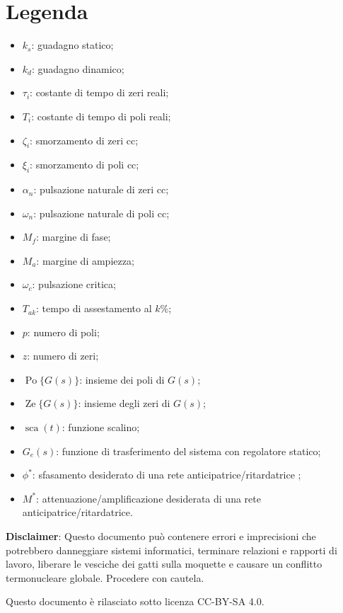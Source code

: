 \documentclass[answers, a4paper, 11pt]{exam}
\DeclareMathOperator{\sca}{sca}
\DeclareMathOperator{\Po}{Po}
\DeclareMathOperator{\Ze}{Ze}
\begin{document}
\section{Legenda}
\begin{itemize}
\item $k_s$: guadagno statico;
\item $k_d$: guadagno dinamico;
\item $\tau_i$: costante di tempo di zeri reali;
\item $T_i$: costante di tempo di poli reali;
\item $\zeta_i$: smorzamento di zeri cc;
\item $\xi_i$: smorzamento di poli cc;
\item $\alpha_n$: pulsazione naturale di zeri cc;
\item $\omega_n$: pulsazione naturale di poli cc;
\item $M_f$: margine di fase;
\item $M_a$: margine di ampiezza;
\item $\omega_c$: pulsazione critica;
\item $T_{ak}$: tempo di assestamento al $k\%$;
\item $p$: numero di poli;
\item $z$: numero di zeri;
\item $\Po\{G(s)\}$: insieme dei poli di $G(s)$;
\item $\Ze\{G(s)\}$: insieme degli zeri di $G(s)$;
\item $\sca(t)$: funzione scalino;
\item $G_e(s)$: funzione di trasferimento del sistema con regolatore statico;
\item $\phi^*$: sfasamento desiderato di una rete anticipatrice/ritardatrice ;
\item $M^*$: attenuazione/amplificazione desiderata di una rete anticipatrice/ritardatrice.
\end{itemize}
\fi
\textbf{Disclaimer}:  Questo documento può contenere errori e imprecisioni che potrebbero danneggiare sistemi informatici, terminare relazioni e rapporti di lavoro, liberare le vesciche dei gatti sulla moquette e causare un conflitto termonucleare globale.
Procedere con cautela.

Questo documento è rilasciato sotto licenza CC-BY-SA 4.0. \ccbysa
\end{document}
